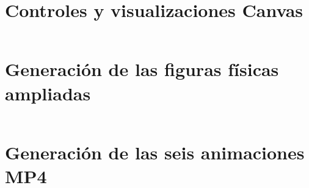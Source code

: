 \documentclass[11pt,a4paper,oneside]{article}
\begin{document}
\section{Controles y visualizaciones Canvas}
\inputminted{javascript}{../lab.js}
\clearpage
\section{Generación de las figuras físicas ampliadas}
\inputminted{python}{../python/figuras_ampliacion.py}
\clearpage
\section{Generación de las seis animaciones MP4}
\inputminted{python}{../python/animar.py}
\end{document}
